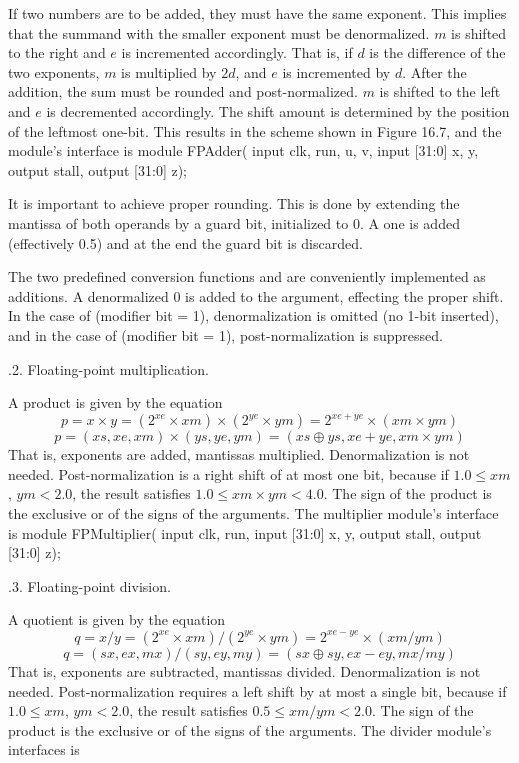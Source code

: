 {If two numbers are to be added, they must have the same exponent. This implies that the summand with the smaller exponent must be denormalized. $m$ is shifted to the right and $e$ is incremented accordingly. That is, if $d$ is the difference of the two exponents, $m$ is multiplied by $2d$, and $e$ is incremented by $d$. After the addition, the sum must be rounded and post-normalized. $m$ is shifted to the left and $e$ is decremented accordingly. The shift amount is determined by the position of the leftmost one-bit. This results in the scheme shown in Figure 16.7, and the module's interface is
\begintt
module FPAdder(
  input clk, run, u, v,
  input [31:0] x, y,
  output stall,
  output [31:0] z);
\endtt


It is important to achieve proper rounding. This is done by extending the mantissa of both operands by a guard bit, initialized to 0. A one is added (effectively 0.5) and at the end the guard bit is discarded.

The two predefined conversion functions  and  are conveniently implemented as additions. A denormalized 0 is added to the argument, effecting the proper shift. In the case of  (modifier bit  = 1), denormalization is omitted (no 1-bit inserted), and in the case of  (modifier bit  = 1), post-normalization is suppressed.

.2. Floating-point multiplication.

A product is given by the equation
$$p = x \times y = (2^{xe} \times xm) \times (2^{ye} \times ym) = 2^{xe+ye} \times (xm \times ym)$$
$$p = (xs, xe, xm) \times (ys, ye, ym) = (xs \oplus ys, xe+ye, xm \times ym)$$
That is, exponents are added, mantissas multiplied. Denormalization is not needed. Post-normalization is a right shift of at most one bit, because if $1.0 \le xm$, $ym < 2.0$, the result satisfies $1.0 \le xm \times ym < 4.0$. The sign of the product is the exclusive or of the signs of the arguments. The multiplier module's interface is
\begintt
module FPMultiplier(
  input clk, run,
  input [31:0] x, y,
  output stall,
  output [31:0] z);
\endtt

.3. Floating-point division.

A quotient is given by the equation
$$q = x/y = (2^{xe} \times xm) / (2^{ye} \times ym) = 2^{xe-ye} \times (xm/ym)$$
$$q = (sx, ex, mx) / (sy, ey, my) = (sx \oplus sy, ex-ey, mx/my)$$
That is, exponents are subtracted, mantissas divided. Denormalization is not needed. Post-normalization requires a left shift by at most a single bit, because if $1.0 \le xm$, $ym < 2.0$, the result satisfies $0.5 \le xm/ym < 2.0$. The sign of the product is the exclusive or of the signs of the arguments. The divider module's interfaces is

}
